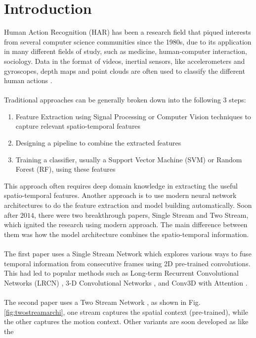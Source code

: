 \documentclass[conference]{IEEEtran}
\begin{document}
\section{Introduction}
Human Action Recognition (HAR) has been a research field that piqued interests from several computer science communities since the 1980s, due to its application in many different fields of study, such as medicine, human-computer interaction, sociology. Data in the format of videos, inertial sensors, like accelerometers  and gyroscopes, depth maps and point clouds are often used to classify the different human actions \cite{4487086}\cite{7881728}. \\ \\
Traditional approaches can be generally broken down into the following 3 steps:
\begin{enumerate}
\item Feature Extraction using Signal Processing or Computer Vision techniques to capture relevant spatio-temporal features \cite{5995407}\cite{1238378}\cite{1570899}
\item Designing a pipeline to combine the extracted features 
\item Training a classifier, usually a Support Vector Machine (SVM) or Random Forest (RF), using these features  
\end{enumerate}
\vspace{0.5cm}
This approach often requires deep domain knowledge in extracting the useful spatio-temporal features. Another approach is to use modern neural network architectures to do the feature extraction and model building automatically. Soon after $2014$, there were two breakthrough papers, Single Stream and Two Stream, which ignited the research using modern approach. The main difference between them was how the model architecture combines the spatio-temporal information. \\ \\
The first paper \cite{KarpathyCVPR14} uses a 
Single Stream Network which explores various ways to fuse temporal information from consecutive frames using 2D pre-trained convolutions. This had led to popular methods such as Long-term Recurrent Convolutional Networks (LRCN) \cite{DonahueHGRVSD14},
3-D Convolutional Networks \cite{TranBFTP14}, and 
Conv3D with Attention \cite{YaoTCBPLC}. \\ \\
The second paper uses a Two Stream Network \cite{SimonyanZ14}, as shown in Fig. \ref{fig:twostreamarchi}, one stream captures the spatial context (pre-trained), while the other captures the motion context. Other variants are soon developed as like the 
\end{document}
